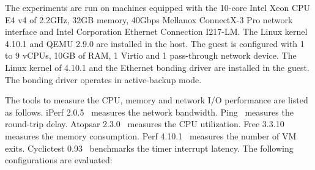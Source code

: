 
The experiments are run on machines equipped with the 10-core
Intel Xeon CPU E4 v4 of 2.2GHz, 32GB memory, 40Gbps Mellanox
ConnectX-3 Pro network interface and Intel Corporation
Ethernet Connection I217-LM. The Linux kernel 4.10.1 and QEMU
2.9.0 are installed in the host. The guest is configured with
1 to 9 vCPUs, 10GB of RAM, 1 Virtio and 1 pass-through network
device. The Linux kernel of 4.10.1 and the Ethernet bonding
driver are installed in the guest. The bonding driver operates
in active-backup mode.

The tools to measure the CPU, memory and network I/O
performance are listed as follows. iPerf 2.0.5~\cite{iperf}
measures the network bandwidth. Ping~\cite{ping} measures the
round-trip delay. Atopsar 2.3.0~\cite{atopsar} measures the
CPU utilization. Free 3.3.10~\cite{free} measures the memory
consumption. Perf 4.10.1~\cite{perf} measures the number of VM
exits. Cyclictest 0.93~\cite{cyclictest} benchmarks the timer
interrupt latency. 
The following configurations are evaluated:

